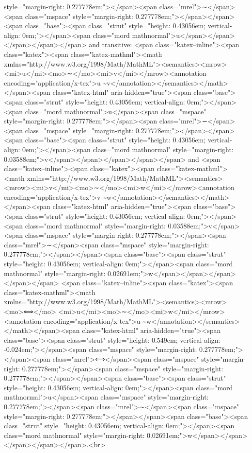 style="margin-right: 0.277778em;"></span><span class="mrel">∼</span><span class="mspace" style="margin-right: 0.277778em;"></span></span><span class="base"><span class="strut" style="height: 0.43056em; vertical-align: 0em;"></span><span class="mord mathnormal">u</span></span></span></span></span> and transitive: <span class="katex--inline"><span class="katex"><span class="katex-mathml"><math xmlns="http://www.w3.org/1998/Math/MathML"><semantics><mrow><mi>u</mi><mo>∼</mo><mi>v</mi></mrow><annotation encoding="application/x-tex">u \sim v</annotation></semantics></math></span><span class="katex-html" aria-hidden="true"><span class="base"><span class="strut" style="height: 0.43056em; vertical-align: 0em;"></span><span class="mord mathnormal">u</span><span class="mspace" style="margin-right: 0.277778em;"></span><span class="mrel">∼</span><span class="mspace" style="margin-right: 0.277778em;"></span></span><span class="base"><span class="strut" style="height: 0.43056em; vertical-align: 0em;"></span><span class="mord mathnormal" style="margin-right: 0.03588em;">v</span></span></span></span></span> and <span class="katex--inline"><span class="katex"><span class="katex-mathml"><math xmlns="http://www.w3.org/1998/Math/MathML"><semantics><mrow><mi>v</mi><mo>∼</mo><mi>w</mi></mrow><annotation encoding="application/x-tex">v \sim w</annotation></semantics></math></span><span class="katex-html" aria-hidden="true"><span class="base"><span class="strut" style="height: 0.43056em; vertical-align: 0em;"></span><span class="mord mathnormal" style="margin-right: 0.03588em;">v</span><span class="mspace" style="margin-right: 0.277778em;"></span><span class="mrel">∼</span><span class="mspace" style="margin-right: 0.277778em;"></span></span><span class="base"><span class="strut" style="height: 0.43056em; vertical-align: 0em;"></span><span class="mord mathnormal" style="margin-right: 0.02691em;">w</span></span></span></span></span> <span class="katex--inline"><span class="katex"><span class="katex-mathml"><math xmlns="http://www.w3.org/1998/Math/MathML"><semantics><mrow>  <mo>⟺</mo>  <mi>u</mi><mo>∼</mo><mi>w</mi></mrow><annotation encoding="application/x-tex">\iff u \sim w</annotation></semantics></math></span><span class="katex-html" aria-hidden="true"><span class="base"><span class="strut" style="height: 0.549em; vertical-align: -0.024em;"></span><span class="mspace" style="margin-right: 0.277778em;"></span><span class="mrel">⟺</span><span class="mspace" style="margin-right: 0.277778em;"></span><span class="mspace" style="margin-right: 0.277778em;"></span></span><span class="base"><span class="strut" style="height: 0.43056em; vertical-align: 0em;"></span><span class="mord mathnormal">u</span><span class="mspace" style="margin-right: 0.277778em;"></span><span class="mrel">∼</span><span class="mspace" style="margin-right: 0.277778em;"></span></span><span class="base"><span class="strut" style="height: 0.43056em; vertical-align: 0em;"></span><span class="mord mathnormal" style="margin-right: 0.02691em;">w</span></span></span></span></span>.<br>
